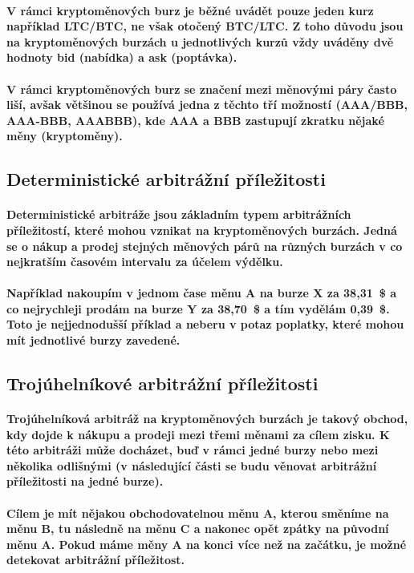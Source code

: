 \documentclass[thesis=B,czech]{FITthesis}[2019/03/21]
\begin{document}
\paragraph{
V rámci kryptoměnových burz je běžné uvádět pouze jeden kurz například LTC/BTC, ne však otočený BTC/LTC. Z toho důvodu jsou na kryptoměnových burzách u jednotlivých kurzů vždy uváděny dvě hodnoty bid (nabídka) a ask (poptávka). 
}
\paragraph{
V rámci kryptoměnových burz se značení mezi měnovými páry často liší, avšak většinou se používá jedna z těchto tří možností (AAA/BBB, AAA-BBB, AAABBB), kde AAA a BBB zastupují zkratku nějaké měny (kryptoměny).
}
\subsection{Deterministické arbitrážní příležitosti}
\paragraph{
Deterministické arbitráže jsou základním typem arbitrážních příležitostí, které mohou vznikat na kryptoměnových burzách. Jedná se o nákup a prodej stejných měnových párů na různých burzách v co nejkratším časovém intervalu za účelem výdělku. \cite{CZInvestor} \cite{TowardsDataScience}
}
\paragraph{
Například nakoupím v jednom čase měnu A na burze X za 38,31~\$ a co nejrychleji prodám na burze Y za 38,70~\$ a tím vydělám 0,39~\$. Toto je nejjednodušší příklad a neberu v potaz poplatky, které mohou mít jednotlivé burzy zavedené. 
}
\subsection{Trojúhelníkové arbitrážní příležitosti}
\paragraph{
Trojúhelníková arbitráž na kryptoměnových burzách je takový obchod, kdy dojde k nákupu a prodeji mezi třemi měnami za cílem zisku. K této arbitráži může docházet, buď v rámci jedné burzy nebo mezi několika odlišnými (v následující části se budu věnovat arbitrážní příležitosti na jedné burze). \cite{TradingStrategy}
}
\paragraph{
Cílem je mít nějakou obchodovatelnou měnu A, kterou směníme na měnu B, tu následně na měnu C a nakonec opět zpátky na původní měnu A. Pokud máme měny A na konci více než na začátku, je možné detekovat arbitrážní příležitost.
}
\end{document}
